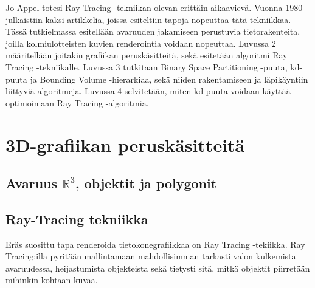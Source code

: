 \documentclass[a4paper,12pt, titlepage]{article}
\theoremstyle{break}
\newcommand{\R}{\mathbb{R}}
\begin{document}
Jo Appel totesi Ray Tracing -tekniikan olevan erittäin aikaavievä. Vuonna 1980 julkaistiin kaksi artikkelia, joissa esiteltiin tapoja nopeuttaa tätä tekniikkaa.\cite{fuchs} \cite{rubin} \\

Tässä tutkielmassa esitellään avaruuden jakamiseen perustuvia tietorakenteita, joilla kolmiulotteisten kuvien renderointia voidaan nopeuttaa. Luvussa 2 määritellään joitakin grafiikan peruskäsitteitä, sekä esitetään algoritmi Ray Tracing -tekniikalle. Luvussa 3 tutkitaan Binary Space Partitioning -puuta, kd-puuta ja Bounding Volume -hierarkiaa, sekä niiden rakentamiseen ja läpikäyntiin liittyviä algoritmeja. Luvussa 4 selvitetään, miten kd-puuta voidaan käyttää optimoimaan Ray Tracing -algoritmia.



\section{3D-grafiikan peruskäsitteitä}
\subsection{Avaruus $\R^3$, objektit ja polygonit}


\subsection{Ray-Tracing tekniikka}

Eräs suosittu tapa renderoida tietokonegrafiikkaa on Ray Tracing -tekiikka. Ray Tracing:illa pyritään mallintamaan mahdollisimman tarkasti valon kulkemista avaruudessa, heijastumista objekteista sekä tietysti sitä, mitkä objektit piirretään mihinkin kohtaan kuvaa. \\
\end{document}
